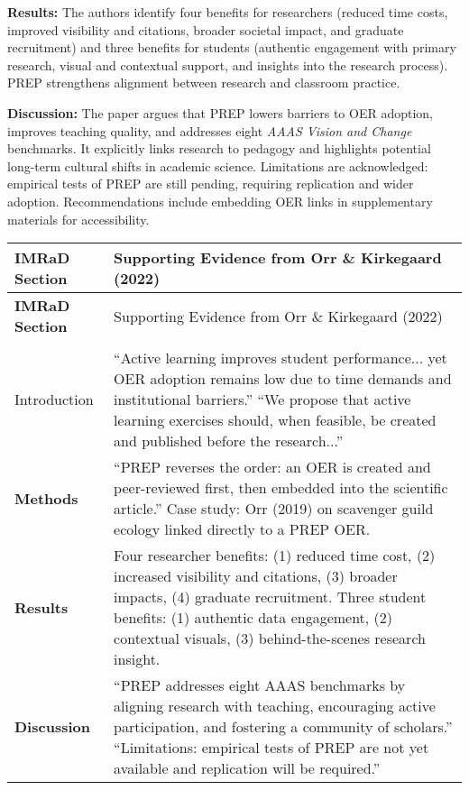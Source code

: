 \documentclass[12pt,a4paper]{article}
\begin{document}
\medskip
\textbf{Results:}  
The authors identify four benefits for researchers (reduced time costs, improved visibility and citations, broader societal impact, and graduate recruitment) and three benefits for students (authentic engagement with primary research, visual and contextual support, and insights into the research process). PREP strengthens alignment between research and classroom practice.

\medskip
\textbf{Discussion:}  
The paper argues that PREP lowers barriers to OER adoption, improves teaching quality, and addresses eight \textit{AAAS Vision and Change} benchmarks. It explicitly links research to pedagogy and highlights potential long-term cultural shifts in academic science. Limitations are acknowledged: empirical tests of PREP are still pending, requiring replication and wider adoption. Recommendations include embedding OER links in supplementary materials for accessibility.
\newpage
\vspace{1.5em}

\renewcommand{\arraystretch}{1.3} %
\small %

\begin{longtable}{>{\bfseries}p{4cm} p{11cm}}
\toprule
IMRaD Section & Supporting Evidence from Orr \& Kirkegaard (2022) \\
\midrule
\endfirsthead
\toprule
IMRaD Section & Supporting Evidence from Orr \& Kirkegaard (2022) \\
\midrule
\endhead
\midrule
\multicolumn{2}{r}{\textit{Continued on next page}} \\
\midrule
\endfoot
\bottomrule
\endlastfoot

Introduction 
& ``Active learning improves student performance... yet OER adoption remains low due to time demands and institutional barriers.'' \newline
``We propose that active learning exercises should, when feasible, be created and published before the research...'' \\

\addlinespace
Methods 
& ``PREP reverses the order: an OER is created and peer-reviewed first, then embedded into the scientific article.'' \newline
Case study: Orr (2019) on scavenger guild ecology linked directly to a PREP OER. \\

\addlinespace
Results 
& Four researcher benefits: (1) reduced time cost, (2) increased visibility and citations, (3) broader impacts, (4) graduate recruitment. \newline
Three student benefits: (1) authentic data engagement, (2) contextual visuals, (3) behind-the-scenes research insight. \\

\addlinespace
Discussion 
& ``PREP addresses eight AAAS benchmarks by aligning research with teaching, encouraging active participation, and fostering a community of scholars.'' \newline
``Limitations: empirical tests of PREP are not yet available and replication will be required.'' \\
\end{longtable}
\end{document}
